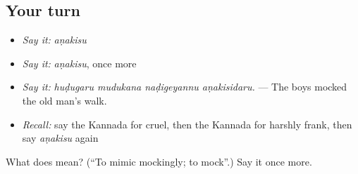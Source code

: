 \subsection*{Your turn}
\begin{itemize}
\raggedright
  \item \emph{Say it:} \emph{aṇakisu}
  \item \emph{Say it:} \emph{aṇakisu}, once more
  \item \emph{Say it:} \emph{huḍugaru mudukana naḍigeyannu aṇakisidaru.} — The boys mocked the old man's walk.
  \item \emph{Recall:} say the Kannada for cruel, then the Kannada for harshly frank, then say \emph{aṇakisu} again
\end{itemize}

\begin{tcolorbox}[breakable,colback=teal!4,colframe=teal!35!black,title={Before you move on}]
What does  mean? (\textquotedblleft{}To mimic mockingly; to mock\textquotedblright{}.) Say it once more.
\end{tcolorbox}
